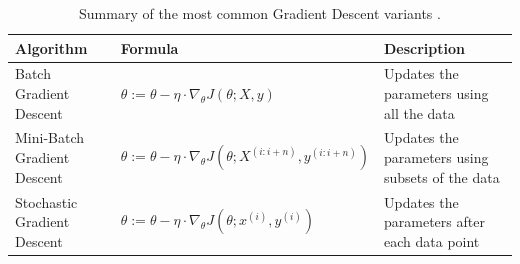 \begin{table}[htb!]
\centering
\footnotesize
\caption{Summary of the most common Gradient Descent variants \cite{goodfellow_deep_2016}.}
\label{Tables:GradientDescent}
\begin{tabularx}{\textwidth}{@{}lXl@{}}
\toprule
\textbf{Algorithm} & \textbf{Formula} & \textbf{Description} \\
\midrule
Batch Gradient Descent & \(\theta := \theta - \eta \cdot \nabla_{\theta} J(\theta; X, y)\) & Updates the parameters using all the data \\
\addlinespace
Mini-Batch Gradient Descent & \(\theta := \theta - \eta \cdot \nabla_{\theta} J(\theta; X^{(i:i+n)}, y^{(i:i+n)})\) & Updates the parameters using subsets of the data \\
\addlinespace
Stochastic Gradient Descent & \(\theta := \theta - \eta \cdot \nabla_{\theta} J(\theta; x^{(i)}, y^{(i)})\) & Updates the parameters after each data point \\
\bottomrule
\end{tabularx}
\end{table}